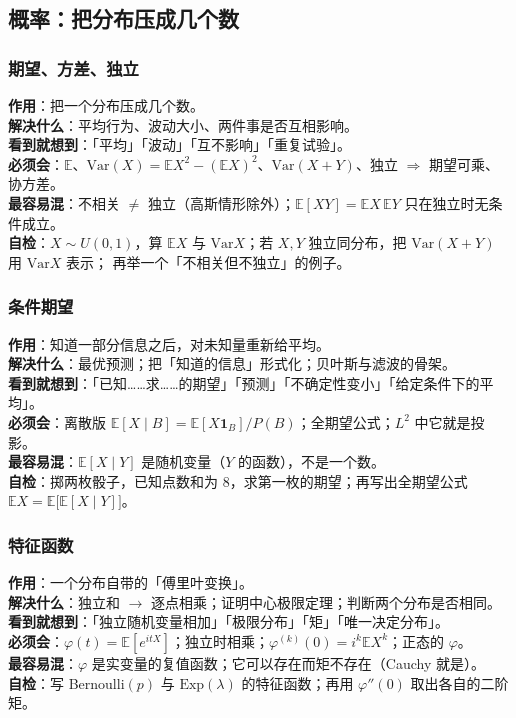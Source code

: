 \subsection{概率：把分布压成几个数}
\label{app:prob}

\subsubsection*{期望、方差、独立}
\textbf{作用}：把一个分布压成几个数。\\
\textbf{解决什么}：平均行为、波动大小、两件事是否互相影响。\\
\textbf{看到就想到}：「平均」「波动」「互不影响」「重复试验」。\\
\textbf{必须会}：$\mathbb{E}$、$\mathrm{Var}(X)=\mathbb{E}X^{2}-(\mathbb{E}X)^{2}$、$\mathrm{Var}(X+Y)$、独立 $\Rightarrow$ 期望可乘、协方差。\\
\textbf{最容易混}：不相关 $\ne$ 独立（高斯情形除外）；$\mathbb{E}[XY]=\mathbb{E}X\,\mathbb{E}Y$ 只在独立时无条件成立。\\
\textbf{自检}：$X\sim U(0,1)$，算 $\mathbb{E}X$ 与 $\mathrm{Var}X$；若 $X,Y$ 独立同分布，把 $\mathrm{Var}(X+Y)$ 用 $\mathrm{Var}X$ 表示；
再举一个「不相关但不独立」的例子。

\subsubsection*{条件期望}
\textbf{作用}：知道一部分信息之后，对未知量重新给平均。\\
\textbf{解决什么}：最优预测；把「知道的信息」形式化；贝叶斯与滤波的骨架。\\
\textbf{看到就想到}：「已知……求……的期望」「预测」「不确定性变小」「给定条件下的平均」。\\
\textbf{必须会}：离散版 $\mathbb{E}[X\mid B]=\mathbb{E}[X\mathbf{1}_{B}]/P(B)$；全期望公式；$L^{2}$ 中它就是投影。\\
\textbf{最容易混}：$\mathbb{E}[X\mid Y]$ 是随机变量（$Y$ 的函数），不是一个数。\\
\textbf{自检}：掷两枚骰子，已知点数和为 $8$，求第一枚的期望；再写出全期望公式
$\mathbb{E}X=\mathbb{E}\big[\mathbb{E}[X\mid Y]\big]$。

\subsubsection*{特征函数}
\textbf{作用}：一个分布自带的「傅里叶变换」。\\
\textbf{解决什么}：独立和 $\to$ 逐点相乘；证明中心极限定理；判断两个分布是否相同。\\
\textbf{看到就想到}：「独立随机变量相加」「极限分布」「矩」「唯一决定分布」。\\
\textbf{必须会}：$\varphi(t)=\mathbb{E}[e^{itX}]$；独立时相乘；$\varphi^{(k)}(0)=i^{k}\mathbb{E}X^{k}$；正态的 $\varphi$。\\
\textbf{最容易混}：$\varphi$ 是实变量的复值函数；它可以存在而矩不存在（Cauchy 就是）。\\
\textbf{自检}：写 Bernoulli$(p)$ 与 $\mathrm{Exp}(\lambda)$ 的特征函数；再用 $\varphi''(0)$ 取出各自的二阶矩。

